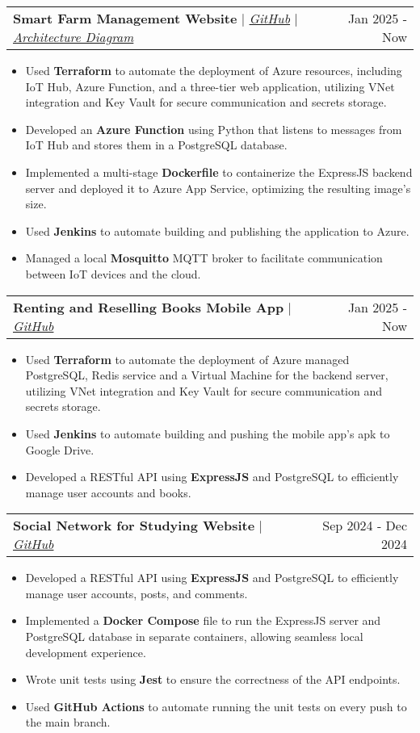 \documentclass[letterpaper,11pt]{article}
\makeatletter
\newcommand{\resumeItem}[1]{
  \item\small{
    {#1 \vspace{-2pt}}
  }
}
\newcommand{\resumeProjectHeading}[2]{
    \vspace{-2pt}\item
    \begin{tabular*}{0.97\textwidth}{l@{\extracolsep{\fill}}r}
      #1 & \small#2 \\
    \end{tabular*}\vspace{-7pt}
}
\newcommand{\resumeItemListStart}{\begin{itemize}}
\newcommand{\resumeItemListEnd}{\end{itemize}\vspace{-5pt}}
\makeatother
\begin{document}
      \resumeProjectHeading
        {\textbf{Smart Farm Management Website} $|$ \emph{\href{https://github.com/kng1259/IOT-project}{GitHub}} $|$ \emph{\href{https://drive.google.com/file/d/1R50MEnKQcrV0OXfp1K20jsz2jnyDsDmk/view?usp=sharing}{Architecture Diagram}}}{Jan 2025 - Now}
          \resumeItemListStart
            \resumeItem{Used \textbf{Terraform} to automate the deployment of Azure resources, including IoT Hub, Azure Function, and a three-tier web application, utilizing VNet integration and Key Vault for secure communication and secrets storage.}
            \resumeItem{Developed an \textbf{Azure Function} using Python that listens to messages from IoT Hub and stores them in a PostgreSQL database.}
            \resumeItem{Implemented a multi-stage \textbf{Dockerfile} to containerize the ExpressJS backend server and deployed it to Azure App Service, optimizing the resulting image's size.}
            \resumeItem{Used \textbf{Jenkins} to automate building and publishing the application to Azure.}
            \resumeItem{Managed a local \textbf{Mosquitto} MQTT broker to facilitate communication between IoT devices and the cloud.}
          \resumeItemListEnd
      
      \resumeProjectHeading
        {\textbf{Renting and Reselling Books Mobile App} $|$ \emph{\href{https://github.com/btram11/Mobile-242}{GitHub}}}{Jan 2025 - Now}
          \resumeItemListStart
            \resumeItem{Used \textbf{Terraform} to automate the deployment of Azure managed PostgreSQL, Redis service and a Virtual Machine for the backend server, utilizing VNet integration and Key Vault for secure communication and secrets storage.}
            \resumeItem{Used \textbf{Jenkins} to automate building and pushing the mobile app's apk to Google Drive.}
            \resumeItem{Developed a {RESTful API} using \textbf{ExpressJS} and PostgreSQL to efficiently manage user accounts and books.}
          \resumeItemListEnd

      \resumeProjectHeading
        {\textbf{Social Network for Studying Website} $|$ \emph{\href{https://github.com/NguyenVu04/Do_An}{GitHub}}}{Sep 2024 - Dec 2024}
          \resumeItemListStart
            \resumeItem{Developed a {RESTful API} using \textbf{ExpressJS} and PostgreSQL to efficiently manage user accounts, posts, and comments.}
            \resumeItem{Implemented a \textbf{Docker Compose} file to run the ExpressJS server and PostgreSQL database in separate containers, allowing seamless local development experience.}
            \resumeItem{Wrote unit tests using \textbf{Jest} to ensure the correctness of the API endpoints.}
            \resumeItem{Used \textbf{GitHub Actions} to automate running the unit tests on every push to the main branch.}
          \resumeItemListEnd
      
\end{document}
